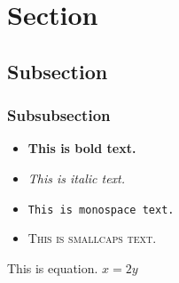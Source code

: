 \documentclass[palatino]{ist-report}
\begin{document}
\section{Section}

\lipsum[1]

\subsection{Subsection}

\lipsum[1-2]

\subsubsection{Subsubsection}

\begin{itemize}
	\item \textbf{This is bold text.}
	\item \textit{This is italic text.}
	\item \texttt{This is monospace text.}
	\item \textsc{This is smallcaps text.}
\end{itemize}

This is equation. $x = 2y$
\end{document}
